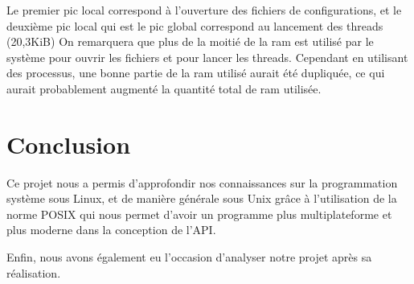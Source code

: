 \documentclass[article, backcover, french, nodocumentinfo]{upmethodology-document}
\begin{document}
				Le premier pic local correspond à l'ouverture des fichiers de configurations,
				et le deuxième pic local qui est le pic global correspond au lancement des threads (20,3KiB)
				On remarquera que plus de la moitié de la ram est utilisé par le système pour ouvrir les fichiers et pour lancer les threads.
				Cependant en utilisant des processus, une bonne partie de la ram utilisé aurait été dupliquée, ce qui aurait probablement augmenté la quantité total de
				ram utilisée.

	\section{Conclusion}
		Ce projet nous a permis d'approfondir nos connaissances sur la programmation système sous Linux, et de manière générale
		sous Unix grâce à l'utilisation de la norme POSIX qui nous permet d'avoir un programme plus multiplateforme et plus moderne
		dans la conception de l'API.

		Enfin, nous avons également eu l'occasion d'analyser notre projet après sa réalisation.
\end{document}
